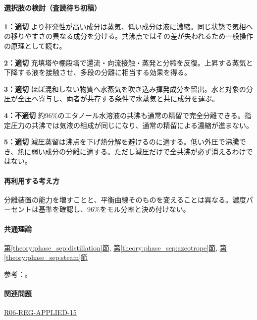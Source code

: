 \paragraph{選択肢の検討（査読待ち初稿）}\mbox{}\par

\noindent\textbf{1：適切} より揮発性が高い成分は蒸気、低い成分は液に濃縮。同じ状態で気相への移りやすさの異なる成分を分ける。共沸点ではその差が失われるため一般操作の原理として読む。\par

\noindent\textbf{2：適切} 充填塔や棚段塔で還流・向流接触・蒸発と分縮を反復。上昇する蒸気と下降する液を接触させ、多段の分離に相当する効果を得る。\par

\noindent\textbf{3：適切} ほぼ混和しない物質へ水蒸気を吹き込み揮発成分を留出。水と対象の分圧が全圧へ寄与し、両者が共存する条件で水蒸気と共に成分を運ぶ。\par

\noindent\textbf{4：不適切} 約96\%のエタノール水溶液の共沸も通常の精留で完全分離できる。指定圧力の共沸では気液の組成が同じになり、通常の精留による濃縮が進まない。\par

\noindent\textbf{5：適切} 減圧蒸留は沸点を下げ熱分解を避けるのに適する。低い外圧で沸騰でき、熱に弱い成分の分離に適する。ただし減圧だけで全共沸が必ず消えるわけではない。\par

\paragraph{再利用する考え方} 分離装置の能力を増すことと、平衡曲線そのものを変えることは異なる。濃度パーセントは基準を確認し、96\%をモル分率と決め付けない。

\paragraph{共通理論} \hyperref[theory:phase_sep:distillation]{第\ref*{theory:phase_sep:distillation}節}, \hyperref[theory:phase_sep:azeotrope]{第\ref*{theory:phase_sep:azeotrope}節}, \hyperref[theory:phase_sep:steam]{第\ref*{theory:phase_sep:steam}節}

\par 参考：\cite{nptel_distillation1,nptel_azeotrope}。

\paragraph{関連問題} \hyperref[q:r06-reg-applied-15]{R06-REG-APPLIED-15}

